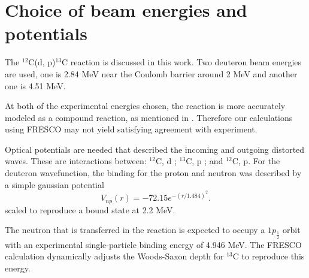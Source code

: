 \section{Choice of beam energies and potentials} \label{part1}
	The $^{12}$C(d, p)$^{13}$C reaction is discussed in this work. 
	Two deuteron beam energies are used, one is 2.84 MeV near the Coulomb barrier around 2 MeV and another one is 4.51 MeV.
	
	At both of the experimental energies chosen, the reaction is more accurately modeled as a compound reaction, as mentioned in \cite{PhysRev.101.209}.
	Therefore our calculations using FRESCO may not yield satisfying agreement with experiment.
	
	Optical potentials are needed that described the incoming and outgoing distorted waves.  
	These are interactions between: $^{12}$C, d \cite{PhysRevC.73.054605}; $^{13}$C, p \cite{PhysRevC.4.1114}; and $^{12}$C, p\cite{PTCOG}.
	For the deuteron wavefunction, the binding for the proton and neutron was described by a simple gaussian potential 
	\begin{equation}
		V_{np}(r)=-72.15e^{-(r/1.484)^2}.
	\end{equation}
	scaled to reproduce a bound state at 2.2 MeV.
	
	The neutron that is transferred in the reaction is expected to occupy a $1p_{\frac{1}{2}}$ orbit with an experimental single-particle binding energy of 4.946 MeV. 
	The FRESCO calculation dynamically adjusts the Woods-Saxon depth for $^{13}$C to reproduce this energy.
	
	